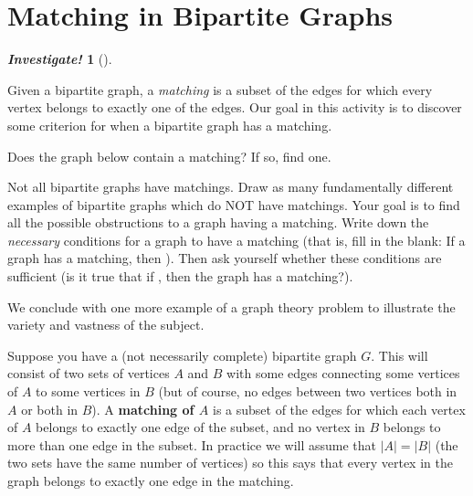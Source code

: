 \documentclass[10pt,]{book}
\newcommand{\terminology}[1]{\textbf{#1}}
\theoremstyle{plain}
\theoremstyle{definition}
\theoremstyle{definition}
\newtheorem{investigation}[project]{\emph{Investigate!}}
\theoremstyle{definition}
\numberwithin{equation}{chapter}
\newcommand{\vtx}[2]{node[fill,circle,inner sep=0pt, minimum size=4pt,label=#1:#2]{}}
\renewcommand{\v}{\vtx{above}{}}
\begin{document}
\section[Matching in Bipartite Graphs]{Matching in Bipartite Graphs}\label{sec_matchings}
\begin{investigation}[]\label{investigation-36}

Given a bipartite graph, a \emph{matching} is a subset of the edges for which every vertex belongs to exactly one of the edges. Our goal in this activity is to discover some criterion for when a bipartite graph has a matching.
%
\par

Does the graph below contain a matching? If so, find one.
%
\leavevmode%
\begin{figure}
\centering
{
}
\end{figure}
\par

Not all bipartite graphs have matchings. Draw as many fundamentally different examples of bipartite graphs which do NOT have matchings. Your goal is to find all the possible obstructions to a graph having a matching. Write down the \emph{necessary} conditions for a graph to have a matching (that is, fill in the blank: If a graph has a matching, then ). Then ask yourself whether these conditions are sufficient (is it true that if , then the graph has a matching?).
%
\end{investigation}

We conclude with one more example of a graph theory problem to illustrate the variety and vastness of the subject.
%
\par

Suppose you have a (not necessarily complete) bipartite graph \(G\). This will consist of two sets of vertices \(A\) and \(B\) with some edges connecting some vertices of \(A\) to some vertices in \(B\) (but of course, no edges between two vertices both in \(A\) or both in \(B\)). A \terminology{matching of \(A\)} is a subset of the edges for which each vertex of \(A\) belongs to exactly one edge of the subset, and no vertex in \(B\) belongs to more than one edge in the subset. In practice we will assume that \(|A| = |B|\) (the two sets have the same number of vertices) so this says that every vertex in the graph belongs to exactly one edge in the matching.
%
\par
\end{document}
